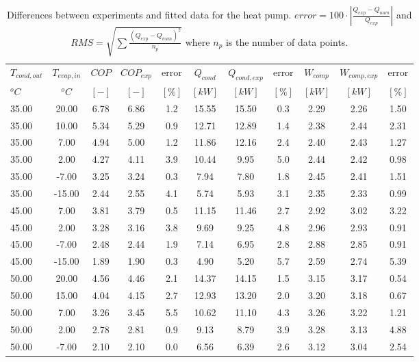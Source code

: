 \documentclass[english]{SPFShortReport}
\begin{document}
\begin{table}[!ht]
\begin{small}
\caption{Differences between experiments and fitted data for the heat pump.          $error=100 \cdot |\frac{Q_{exp}-Q_{num}}{Q_{exp}}|$ and $RMS = \sqrt { \sum{\frac{(Q_{exp}-Q_{num})^2}{n_p}} }$ where $n_p$ is the number of data points.}
\begin{center}
\resizebox{12cm}{!} 
{
\begin{tabular}{l | c c c c c c c c c c } 
\hline
\hline
$T_{cond,out}$ &$T_{evap,in}$ &$COP$ &$COP_{exp}$ &error &$Q_{cond}$ &$Q_{cond,exp}$ &error &$W_{comp}$ &$W_{comp,exp}$ &error \\ 
$^oC$ &$^oC$ &$[-]$ &$[-]$ &$[\%]$ &$[kW]$ &$[kW]$ &$[\%]$ &$[kW]$ &$[kW]$ &$[\%]$\\ 
\hline
35.00  & 20.00 & 6.78 & 6.86 & 1.2 & 15.55 & 15.50 & 0.3 & 2.29 & 2.26 & 1.50\\ 
35.00  & 10.00 & 5.34 & 5.29 & 0.9 & 12.71 & 12.89 & 1.4 & 2.38 & 2.44 & 2.31\\ 
35.00  & 7.00 & 4.94 & 5.00 & 1.2 & 11.86 & 12.16 & 2.4 & 2.40 & 2.43 & 1.27\\ 
35.00  & 2.00 & 4.27 & 4.11 & 3.9 & 10.44 & 9.95 & 5.0 & 2.44 & 2.42 & 0.98\\ 
35.00  & -7.00 & 3.25 & 3.24 & 0.3 & 7.94 & 7.80 & 1.8 & 2.45 & 2.41 & 1.51\\ 
35.00  & -15.00 & 2.44 & 2.55 & 4.1 & 5.74 & 5.93 & 3.1 & 2.35 & 2.33 & 0.99\\ 
45.00  & 7.00 & 3.81 & 3.79 & 0.5 & 11.15 & 11.46 & 2.7 & 2.92 & 3.02 & 3.22\\ 
45.00  & 2.00 & 3.28 & 3.16 & 3.8 & 9.69 & 9.25 & 4.8 & 2.96 & 2.93 & 0.91\\ 
45.00  & -7.00 & 2.48 & 2.44 & 1.9 & 7.14 & 6.95 & 2.8 & 2.88 & 2.85 & 0.91\\ 
45.00  & -15.00 & 1.89 & 1.90 & 0.3 & 4.90 & 5.20 & 5.7 & 2.59 & 2.74 & 5.39\\ 
50.00  & 20.00 & 4.56 & 4.46 & 2.1 & 14.37 & 14.15 & 1.5 & 3.15 & 3.17 & 0.54\\ 
50.00  & 15.00 & 4.04 & 4.15 & 2.7 & 12.93 & 13.20 & 2.0 & 3.20 & 3.18 & 0.67\\ 
50.00  & 7.00 & 3.26 & 3.45 & 5.5 & 10.62 & 11.10 & 4.3 & 3.26 & 3.22 & 1.21\\ 
50.00  & 2.00 & 2.78 & 2.81 & 0.9 & 9.13 & 8.79 & 3.9 & 3.28 & 3.13 & 4.88\\ 
50.00  & -7.00 & 2.10 & 2.10 & 0.0 & 6.56 & 6.39 & 2.6 & 3.12 & 3.04 & 2.54\\ 

\end{tabular}}
\end{center}
\end{small}
\end{table}
\end{document}
